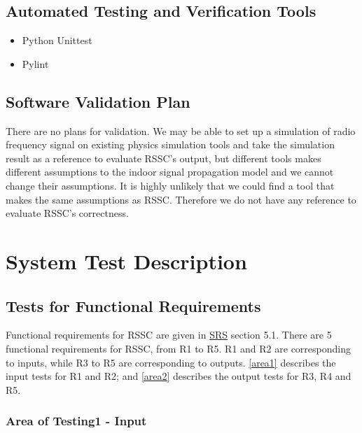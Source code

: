 \documentclass[12pt, titlepage]{article}
\begin{document}
\subsection{Automated Testing and Verification Tools}
\begin{itemize}
	\item Python Unittest
\end{itemize}
\begin{itemize}
	\item Pylint
\end{itemize}

\subsection{Software Validation Plan}

There are no plans for validation. We may be able to set up a simulation of radio
frequency signal on existing physics simulation tools and take the simulation 
result as a reference to evaluate RSSC's output, but different tools makes 
different assumptions to the indoor signal propagation model and we cannot 
change their assumptions. It is highly unlikely that we could find a tool 
that makes the same assumptions as RSSC. Therefore we do not have any reference 
to evaluate RSSC's correctness.


\section{System Test Description}
\label{systd}
	
\subsection{Tests for Functional Requirements}
\label{tfr}

Functional requirements for RSSC are given in 
\href{https://github.com/XingzhiMac/CAS741-Proj/blob/master/docs/SRS/SRS.pdf}
{SRS} section 5.1. There are 5 functional requirements for RSSC, from R1 to R5.
R1 and R2 are corresponding to inputs, while R3 to R5 are corresponding to outputs.
\autoref{area1} describes the input tests for R1 and R2; and \autoref{area2} 
describes the output tests for R3, R4 and R5.

\subsubsection{Area of Testing1 - Input}\label{Ainput}
\label{area1}
\end{document}
